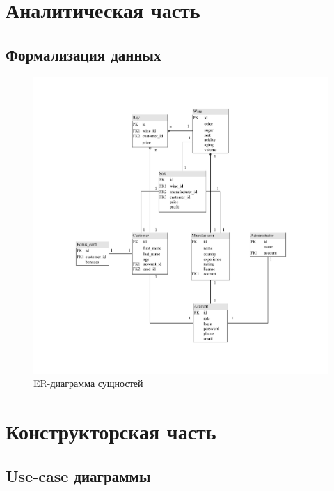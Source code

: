 \chapter{Аналитическая часть}

\section{Формализация данных}

\begin{figure}[H]
	\begin{center}
		\includegraphics[scale=0.75]{img/ER-diagram.pdf}
	\end{center}
	\captionsetup{justification=centering}
	\caption{ER-диаграмма сущностей}
	\label{img:er}
\end{figure}

\chapter{Конструкторская часть}

\section{Use-case диаграммы}

